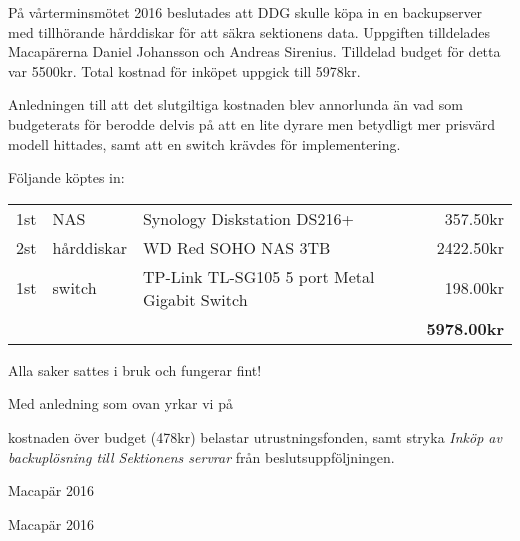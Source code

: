 \documentclass[../_main/handlingar.tex]{subfiles}
\begin{document}

På vårterminsmötet 2016 beslutades att DDG skulle köpa in en backupserver med tillhörande hårddiskar för att säkra sektionens data. Uppgiften tilldelades Macapärerna Daniel Johansson och Andreas Sirenius. Tilldelad budget för detta var 5500kr. Total kostnad för inköpet uppgick till 5978kr.

Anledningen till att det slutgiltiga kostnaden blev annorlunda än vad som budgeterats för berodde delvis på att en lite dyrare men betydligt mer prisvärd modell hittades, samt att en switch krävdes för implementering.

Följande köptes in:
\begin{table}[H]
\begin{tabular}{l l l r}
    1st & NAS & Synology Diskstation DS216+ & 357.50kr\\
    2st & hårddiskar & WD Red SOHO NAS 3TB & 2422.50kr\\
    1st & switch & TP-Link TL-SG105 5 port Metal Gigabit Switch & 198.00kr\\
    \hline
    & & & \textbf{5978.00kr}\\
\end{tabular}
\end{table}

Alla saker sattes i bruk och fungerar fint!

Med anledning som ovan yrkar vi på

\begin{attsatser}
    \att kostnaden över budget (478kr) belastar utrustningsfonden, samt
    \att stryka \emph{Inköp av backuplösning till Sektionens servrar} från beslutsuppföljningen.
\end{attsatser}

\begin{signatures}{2}
    \mvh
    \signature{Daniel Johansson}{Macapär 2016}
    \signature{Andreas Sirenius}{Macapär 2016}
\end{signatures}
\end{document}
